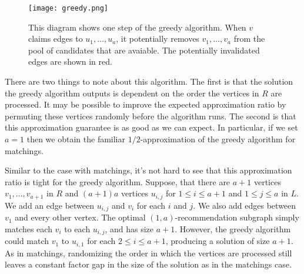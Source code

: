 \begin{figure}[h]
\centering
\texttt{[image: greedy.png]}
\begin{minipage}[h]{.8\linewidth}
\caption{This diagram shows one step of the greedy algorithm. When $v$ claims edges to $u_1,\ldots, u_a$, it potentially removes $v_1,\ldots, v_a$ from the pool of candidates that are avaiable. The potentially invalidated edges are shown in red.}
\end{minipage}
\end{figure}

There are two things to note about this algorithm. The first is
that the solution the greedy algorithm outputs is dependent on the
order the vertices in $R$ are processed. It may be possible to improve
the expected approximation ratio by permuting these vertices randomly
before the algorithm runs. The second is that this approximation
guarantee is as good as we can expect. In particular, if we set $a=1$
then we obtain the familiar $1/2$-approximation of the greedy
algorithm for matchings.


Similar to the case with matchings, it's not hard to see that this
approximation ratio is tight for the greedy algorithm. Suppose, that
there are $a+1$ vertices $v_1,\ldots,v_{a+1}$ in $R$ and $(a+1)a$ 
vertices $u_{i,j}$ for $1\leq i\leq a+1$ and $1\leq j \leq a$ in $L$.
We add an edge between $u_{i,j}$ and $v_{i}$ for each $i$ and $j$.
We also add edges between $v_1$ and every other vertex. The optimal
$(1,a)$-recommendation subgraph simply matches each $v_i$ to each
$u_{i,j}$, and has size $a+1$. However, the greedy algorithm
could match $v_1$ to $u_{i,1}$ for each $2\leq i\leq a+1$, producing
a solution of size $a+1$. As in matchings, randomizing the order in
which the vertices are processed still leaves a constant factor gap
in the size of the solution as in the matchings case.
\cite{KarpVaziraniVazirani1990}


